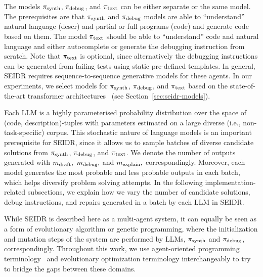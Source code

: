 The models $ \pi_\text{synth} $, $ \pi_\text{debug} $, and $ \pi_\text{text} $ can be either separate or the same model.
The prerequisites are that $ \pi_\text{synth} $ and $ \pi_\text{debug} $ models are able to ``understand'' natural language (descr) and partial or full programs (code) and generate code based on them. 
The model $ \pi_\text{text} $ should be able to ``understand'' code and natural language and either autocomplete or generate the debugging instruction from scratch. 
Note that $ \pi_\text{text} $ is optional, since alternatively the debugging instructions can be generated from failing tests using static pre-defined templates.
In general, SEIDR requires sequence-to-sequence generative models for these agents. 
In our experiments, we select models for $ \pi_\text{synth} $, $ \pi_\text{debug} $, and $ \pi_\text{text} $ based on the state-of-the-art transformer architectures~\cite{vaswaniAttentionAllYou2023} 
(see Section~\ref{sec:seidr-models}). 

Each LLM is a highly parameterised probability distribution over the space of (code, description)-tuples with parameters estimated on a large diverse (i.e., non-task-specific) corpus.
This stochastic nature of language models is an important prerequisite for SEIDR, since it allows us to sample batches of diverse candidate solutions from $ \pi_\text{synth} $, $ \pi_\text{debug} $, and $ \pi_\text{text} $. 
We denote the number of outputs generated with $m_\text{draft},$ $m_\text{debug},$ and $m_\text{explain},$ correspondingly.
Moreover, each model generates the most probable and less probable outputs in each batch, which helps diversify problem solving attempts. 
In the following implementation-related subsections, we explain how we vary the number of candidate solutions, debug instructions, and repairs generated in a batch by each LLM in SEIDR.

While SEIDR is described here as a multi-agent system, it can equally be seen as a form of evolutionary algorithm or genetic programming, where the initialization and mutation steps of the system are performed by LLMs, $ \pi_\text{synth} $ and $ \pi_\text{debug} $, correspondingly.
Throughout this work, we use agent-oriented programming terminology~\cite{shoham1993:agentoriented} and evolutionary optimization terminology interchangeably to try to bridge the gaps between these domains.

